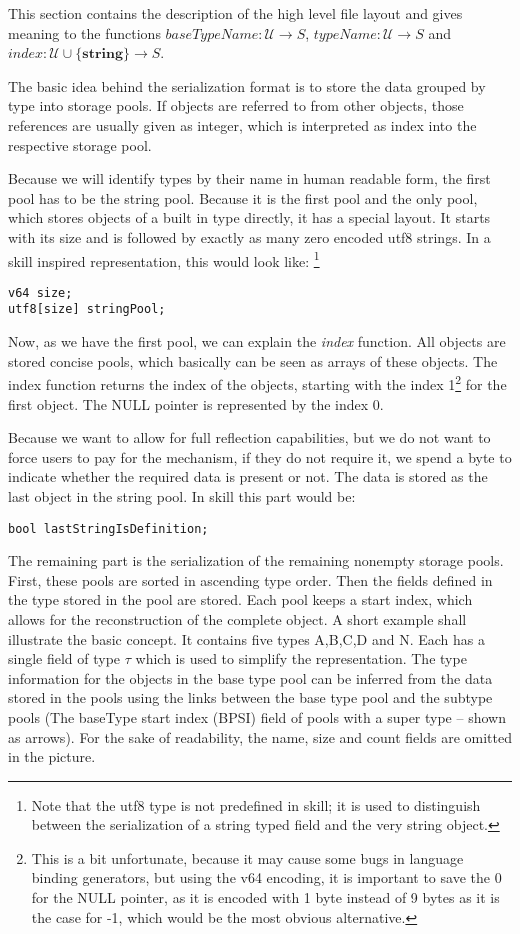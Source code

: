 \documentclass[a4paper,10pt]{article}
\begin{document}
This section contains the description of the high level file layout and gives meaning to the functions $baseTypeName: \mathcal{U} → S$, $typeName: \mathcal{U} → S$ and $index: \mathcal{U}\cup\{\textbf{string}\} → S$.

The basic idea behind the serialization format is to store the data grouped by type into storage pools. If objects are referred to from other objects, those references are usually given as integer, which is interpreted as index into the respective storage pool.

Because we will identify types by their name in human readable form, the first pool has to be the string pool. Because it is the first pool and the only pool, which stores objects of a built in type directly, it has a special layout. It starts with its size and is followed by exactly as many zero encoded utf8 strings. In a \gls{skill} inspired representation, this would look like: \footnote{Note that the utf8 type is not predefined in skill; it is used to distinguish between the serialization of a string typed field and the very string object.}
\begin{verbatim}
v64 size;
utf8[size] stringPool;
\end{verbatim}

Now, as we have the first pool, we can explain the \textit{index} function. All objects are stored concise pools, which basically can be seen as arrays of these objects. The index function returns the index of the objects, starting with the index 1\footnote{This is a bit unfortunate, because it may cause some bugs in language binding generators, but using the v64 encoding, it is important to save the 0 for the NULL pointer, as it is encoded with 1 byte instead of 9 bytes as it is the case for -1, which would be the most obvious alternative.} for the first object. The NULL pointer is represented by the index 0.

Because we want to allow for full reflection capabilities, but we do not want to force users to pay for the mechanism, if they do not require it, we spend a byte to indicate whether the required data is present or not. The data is stored as the last object in the string pool. In skill this part would be:
\begin{verbatim}
bool lastStringIsDefinition;
\end{verbatim}

The remaining part is the serialization of the remaining nonempty storage pools. First, these pools are sorted in ascending type order. Then the fields defined in the type stored in the pool are stored. Each pool keeps a start index, which allows for the reconstruction of the complete object. A short example shall illustrate the basic concept. It contains five types A,B,C,D and N. Each has a single field of type $\tau$ which is used to simplify the representation. The type information for the objects in the base type pool can be inferred from the data stored in the pools using the links between the base type pool and the subtype pools (The \gls{baseType} start index (BPSI) field of pools with a super type -- shown as arrows). For the sake of readability, the name, size and count fields are omitted in the picture.
\end{document}
